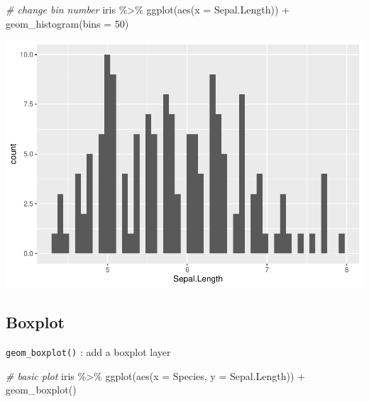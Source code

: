 \documentclass[
]{book}
\newenvironment{Shaded}{\begin{snugshade}}{\end{snugshade}}
\newcommand{\AttributeTok}[1]{\textcolor[rgb]{0.77,0.63,0.00}{#1}}
\newcommand{\CommentTok}[1]{\textcolor[rgb]{0.56,0.35,0.01}{\textit{#1}}}
\newcommand{\DecValTok}[1]{\textcolor[rgb]{0.00,0.00,0.81}{#1}}
\newcommand{\FunctionTok}[1]{\textcolor[rgb]{0.00,0.00,0.00}{#1}}
\newcommand{\NormalTok}[1]{#1}
\newcommand{\SpecialCharTok}[1]{\textcolor[rgb]{0.00,0.00,0.00}{#1}}
\begin{document}
\begin{Shaded}
\begin{Highlighting}[]
\CommentTok{\# change bin number}
\NormalTok{iris }\SpecialCharTok{\%\textgreater{}\%} 
  \FunctionTok{ggplot}\NormalTok{(}\FunctionTok{aes}\NormalTok{(}\AttributeTok{x =}\NormalTok{ Sepal.Length)) }\SpecialCharTok{+}
  \FunctionTok{geom\_histogram}\NormalTok{(}\AttributeTok{bins =} \DecValTok{50}\NormalTok{)}
\end{Highlighting}
\end{Shaded}

\begin{center}\includegraphics{biostats_files/figure-latex/unnamed-chunk-113-3} \end{center}

\hypertarget{boxplot}{%
\subsection{Boxplot}\label{boxplot}}

\texttt{geom\_boxplot()} : add a boxplot layer

\begin{Shaded}
\begin{Highlighting}[]
\CommentTok{\# basic plot}
\NormalTok{iris }\SpecialCharTok{\%\textgreater{}\%} 
  \FunctionTok{ggplot}\NormalTok{(}\FunctionTok{aes}\NormalTok{(}\AttributeTok{x =}\NormalTok{ Species,}
             \AttributeTok{y =}\NormalTok{ Sepal.Length)) }\SpecialCharTok{+}
  \FunctionTok{geom\_boxplot}\NormalTok{()}
\end{Highlighting}
\end{Shaded}
\end{document}
